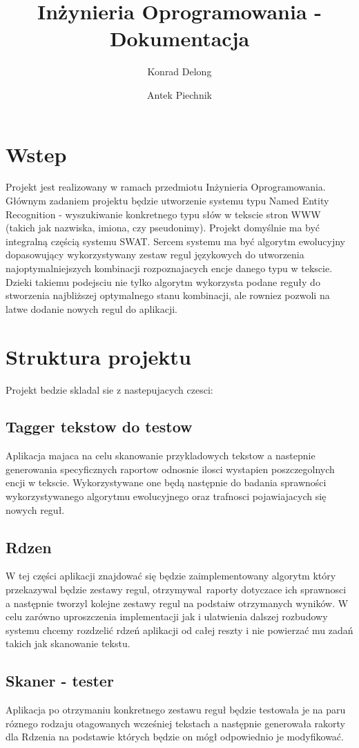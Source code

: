 \documentclass[12pt]{article}
\author{Konrad Delong \and Antek Piechnik}
\title{Inżynieria Oprogramowania - Dokumentacja}
\begin{document}
\maketitle
\tableofcontents
\newpage

\section{Wstep}
Projekt jest realizowany w ramach przedmiotu Inżynieria Oprogramowania. Głównym zadaniem projektu będzie utworzenie systemu typu Named Entity Recognition - wyszukiwanie konkretnego typu słów w tekscie stron WWW (takich jak nazwiska, imiona, czy pseudonimy). Projekt domyślnie ma być integralną częścią systemu SWAT. Sercem systemu ma być algorytm ewolucyjny dopasowujący wykorzystywany zestaw regul językowych do utworzenia najoptymalniejszych kombinacji rozpoznajacych encje danego typu w tekscie. Dzieki takiemu podejsciu nie tylko algorytm wykorzysta podane reguły do stworzenia najbliższej optymalnego stanu kombinacji, ale rowniez pozwoli na latwe dodanie nowych regul do aplikacji.
\section{Struktura projektu}
Projekt bedzie skladal sie z nastepujacych czesci:
\subsection{Tagger tekstow do testow}
Aplikacja majaca na celu skanowanie przykladowych tekstow a nastepnie generowania specyficznych raportow odnosnie ilosci wystapien poszczegolnych encji w tekscie. Wykorzystywane one będą następnie do badania sprawności wykorzystywanego algorytmu ewolucyjnego oraz trafnosci pojawiajacych się nowych reguł.
\subsection{Rdzen}
W tej części aplikacji znajdować się będzie zaimplementowany algorytm który przekazywal będzie zestawy regul, otrzymywal raporty dotyczace ich sprawnosci a następnie tworzyl kolejne zestawy regul na podstaiw otrzymanych wyników. W celu zarówno uproszczenia implementacji jak i ulatwienia dalszej rozbudowy systemu chcemy rozdzelić rdzeń aplikacji od całej reszty i nie powierzać mu zadań takich jak skanowanie tekstu.
\subsection{Skaner - tester}
Aplikacja po otrzymaniu konkretnego zestawu reguł będzie testowała je na paru róznego rodzaju otagowanych wcześniej tekstach a następnie generowała rakorty dla Rdzenia na podstawie których będzie on mógł odpowiednio je modyfikować.
\end{document}

